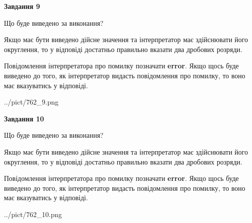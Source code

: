 \documentclass[12pt, ukrainian]{article}
\begin{document}
{\begin {Large}
{\begin {center}\textbf{Завдання 9}\end {center}}\par
Що буде виведено за виконання? \par

Якщо має бути виведено дійсне значення та інтерпретатор має здійснювати його округлення, 
то у відповіді достатньо правильно вказати два дробових розряди.

Повідомлення інтерпретатора про помилку позначати \textbf{error}.
Якщо щось буде виведено до того, як інтерпретатор видасть повідомлення про помилку, 
то воно має вказуватись у відповіді. \par

\begin{center}
	{../pict/762_9.png}
\end{center}
\newpage

{\begin {center}\textbf{Завдання 10}\end {center}}\par
Що буде виведено за виконання? \par

Якщо має бути виведено дійсне значення та інтерпретатор має здійснювати його округлення, 
то у відповіді достатньо правильно вказати два дробових розряди.

Повідомлення інтерпретатора про помилку позначати \textbf{error}.
Якщо щось буде виведено до того, як інтерпретатор видасть повідомлення про помилку, 
то воно має вказуватись у відповіді. \par

\begin{center}
	{../pict/762_10.png}
\end{center}
\newpage

\end {Large}}
\end{document}
